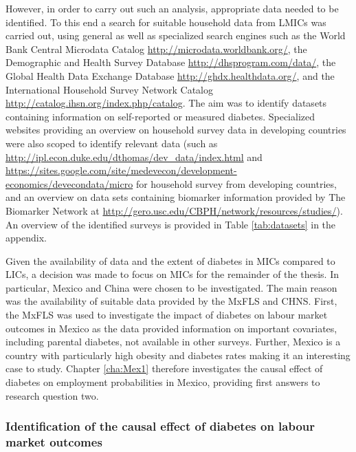 However, in order to carry out such an analysis, appropriate data needed to be identified. To this end a search for suitable household data from \acp{LMIC} was carried out, using general as well as specialized search engines such as the World Bank Central Microdata Catalog  \url{http://microdata.worldbank.org/}, the Demographic and Health Survey Database \url{http://dhsprogram.com/data/}, the Global Health Data Exchange Database \url{http://ghdx.healthdata.org/}, and the International Household Survey Network Catalog \url{http://catalog.ihsn.org/index.php/catalog}. The aim was to identify datasets containing information on self-reported or measured diabetes. Specialized websites providing an overview on household survey data in developing countries were also scoped to identify relevant data (such as \url{http://ipl.econ.duke.edu/dthomas/dev_data/index.html} and \url{https://sites.google.com/site/medevecon/development-economics/devecondata/micro} for household survey from developing countries, and an overview on data sets containing biomarker information provided by The Biomarker Network at \url{http://gero.usc.edu/CBPH/network/resources/studies/}). An overview of the identified surveys is provided in Table \ref{tab:datasets} in the appendix.

Given the availability of data and the extent of diabetes in \acp{MIC} compared to \acp{LIC}, a decision was made to focus on \acp{MIC} for the remainder of the thesis. In particular, Mexico and China were chosen to be investigated. The main reason was the availability of suitable  data provided by the \ac{MxFLS} and \ac{CHNS}. First, the \ac{MxFLS} was used to investigate the impact of diabetes on labour market outcomes in Mexico as the data provided information on important covariates, including parental diabetes, not available in other surveys. Further, Mexico is a country with particularly high obesity and diabetes rates making it an interesting case to study. Chapter \ref{cha:Mex1} therefore investigates the causal effect of diabetes on employment probabilities in Mexico, providing first answers to research question two.

\subsubsection{Identification of the causal effect of diabetes on labour market outcomes}

